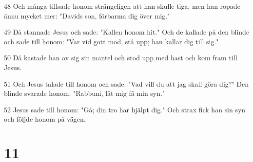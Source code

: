 \par 48 Och många tillsade honom strängeligen att han skulle tiga; men han ropade ännu mycket mer: "Davids son, förbarma dig över mig."
\par 49 Då stannade Jesus och sade: "Kallen honom hit." Och de kallade på den blinde och sade till honom: "Var vid gott mod, stå upp; han kallar dig till sig."
\par 50 Då kastade han av sig sin mantel och stod upp med hast och kom fram till Jesus.
\par 51 Och Jesus talade till honom och sade: "Vad vill du att jag skall göra dig?" Den blinde svarade honom: "Rabbuni, låt mig få min syn."
\par 52 Jesus sade till honom: "Gå; din tro har hjälpt dig." Och strax fick han sin syn och följde honom på vägen.

\chapter{11}

